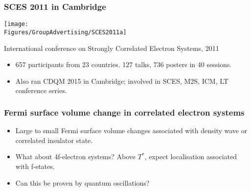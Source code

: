 \begin{frame}[label=SCES2011]
\frametitle{SCES 2011 in Cambridge}
\centerline{\texttt{[image: \\Figures/GroupAdvertising/SCES2011a]}}

\vspace{1em}
\centerline{International conference on Strongly Correlated Electron
  Systems, 2011}
\vspace{1em}
{\scriptsize \begin{itemize}
\item
657 participants from 23 countries. 127 talks, 736 posters in 40
sessions.
\item 
Also ran CDQM 2015 in Cambridge; involved in SCES, M2S, ICM, LT
conference series. 
\end{itemize} }
\end{frame}



\begin{frame}[label=FSInstabilities]
\frametitle{Fermi surface volume change in correlated electron
  systems}
\centerline{}
\begin{itemize}
\item
Large to small Fermi surface volume changes associated with density
wave or correlated insulator state.

\item<visible@2->
What about 4f-electron systems? Above $T^*$, expect localisation associated with
f-states.

\item<visible@2->
Can this be proven by quantum oscillations?

\end{itemize}
\end{frame}



